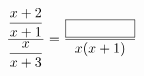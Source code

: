 \hspace*{2mm}\begin{minipage}[t]{\dimexpr\linewidth-2mm\relax}\vspace{0pt}
$\dfrac{\dfrac{x+2}{x+1}}{\dfrac{x}{x+3}}=\dfrac{\blank[5em]}{x(x+1)}$\end{minipage}
